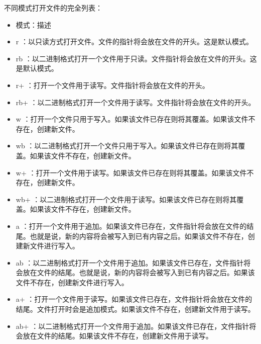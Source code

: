 不同模式打开文件的完全列表：
\begin{itemize}
\item 模式：描述
\item r	：以只读方式打开文件。文件的指针将会放在文件的开头。这是默认模式。
\item rb	：以二进制格式打开一个文件用于只读。文件指针将会放在文件的开头。这是默认模式。
\item r+	：打开一个文件用于读写。文件指针将会放在文件的开头。
\item rb+	：以二进制格式打开一个文件用于读写。文件指针将会放在文件的开头。
\item w	：打开一个文件只用于写入。如果该文件已存在则将其覆盖。如果该文件不存在，创建新文件。
\item wb	：以二进制格式打开一个文件只用于写入。如果该文件已存在则将其覆盖。如果该文件不存在，创建新文件。
\item w+	：打开一个文件用于读写。如果该文件已存在则将其覆盖。如果该文件不存在，创建新文件。
\item wb+	：以二进制格式打开一个文件用于读写。如果该文件已存在则将其覆盖。如果该文件不存在，创建新文件。
\item a	：打开一个文件用于追加。如果该文件已存在，文件指针将会放在文件的结尾。也就是说，新的内容将会被写入到已有内容之后。如果该文件不存在，创建新文件进行写入。
\item ab	：以二进制格式打开一个文件用于追加。如果该文件已存在，文件指针将会放在文件的结尾。也就是说，新的内容将会被写入到已有内容之后。如果该文件不存在，创建新文件进行写入。
\item a+	：打开一个文件用于读写。如果该文件已存在，文件指针将会放在文件的结尾。文件打开时会是追加模式。如果该文件不存在，创建新文件用于读写。
\item ab+	：以二进制格式打开一个文件用于追加。如果该文件已存在，文件指针将会放在文件的结尾。如果该文件不存在，创建新文件用于读写。
\end{itemize}



